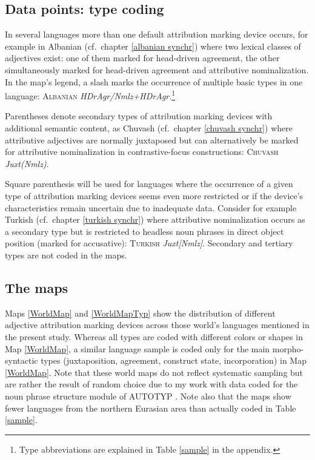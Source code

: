 \subsection[Type coding]{Data points: type coding}
In several languages more than one default attribution marking device occurs, for example in Albanian (cf.~chapter \ref{albanian synchr}) where two lexical classes of adjectives exist: one of them marked for head-driven agreement, the other simultaneously marked for head-driven agreement and attributive nominalization. In the map's legend, a slash marks the occurrence of multiple basic types in one language: \textsc{Albanian} \textit{HDrAgr/Nmlz+HDrAgr}.\footnote{Type abbreviations are explained in Table \ref{sample} in the appendix.}

Parentheses denote secondary types of attribution marking devices with additional semantic content, as Chuvash (cf.~chapter \ref{chuvash synchr}) where attributive adjectives are normally juxtaposed but can alternatively be marked for attributive nominalization in contrastive-focus constructions: \textsc{Chuvash} \textit{Juxt(Nmlz)}.

Square parenthesis will be used for languages where the occurrence of a given type of attribution marking devices seems even more restricted or if the device's characteristics remain uncertain due to inadequate data. Consider for example Turkish (cf.~chapter \ref{turkish synchr}) where attributive nominalization occurs as a secondary type but is restricted to headless noun phrases in direct object position (marked for accusative): \textsc{Turkish} \textit{Juxt[Nmlz]}. 
Secondary and tertiary types are not coded in the maps. 

\subsection{The maps}
Maps \ref{WorldMap} and \ref{WorldMapTyp} show the distribution of different adjective attribution marking devices across those world's languages mentioned in the present study. Whereas all types are coded with different colors or shapes in Map \ref{WorldMap}, a similar language sample is coded only for the main morpho-syntactic types (juxtaposition, agreement, construct state, incorporation) in Map \ref{WorldMap}. Note that these world maps do not reflect systematic sampling but are rather the result of random choice due to my work with data coded for the noun phrase structure module of AUTOTYP \citep{AUTOTYP-NP}. Note also that the maps show fewer languages from the northern Eurasian area than actually coded in Table \ref{sample}.

